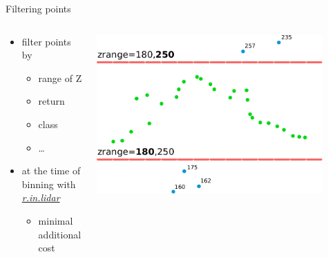 \documentclass[xcolor={dvipsnames,usenames},beamer,aspectratio=169]{beamer}
\newcommand{\gmodule}[1]{\href{http://grass.osgeo.org/grass71/manuals/#1.html}{\emph{#1}}}
\begin{document}
\begin{frame}{Filtering points}

\begin{columns}
\begin{column}{0.45\textwidth}

 \begin{itemize}
  \item filter points by
  \begin{itemize}
    \item range of Z
    \item return
    \item class
    \item \ldots
  \end{itemize}
  \item at the time of binning with \gmodule{r.in.lidar}
    \begin{itemize}
    \item minimal additional cost
    \end{itemize}
\end{itemize}

\end{column}
\begin{column}{0.53\textwidth}

\begin{center}
  \includegraphics[width=0.88\textwidth]{features/zrange}
\end{center}

\end{column}
\end{columns}

\end{frame}
\end{document}
